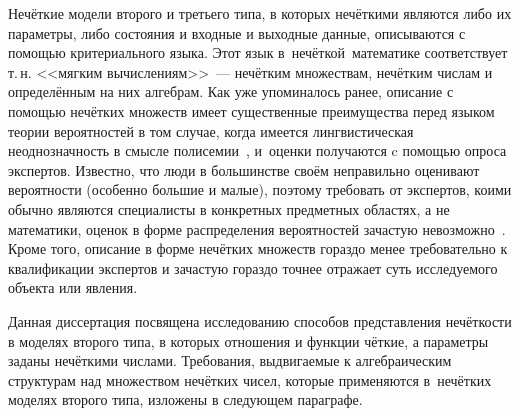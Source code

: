 Нечёткие модели второго и третьего типа, в которых нечёткими являются либо их параметры, либо состояния и входные и выходные данные, описываются с помощью критериального языка. Этот язык в~нечёткой~математике соответствует т.\,н. <<мягким вычислениям>>~--- нечётким множествам, нечётким числам и определённым на них алгебрам. Как уже упоминалось ранее, описание с помощью нечётких множеств имеет существенные преимущества перед языком теории вероятностей в том случае, когда имеется лингвистическая неоднозначность в смысле полисемии~\cite{Borisov_Alexeev_Msk}, и~оценки получаются c помощью опроса экспертов. Известно, что люди в большинстве своём неправильно оценивают вероятности (особенно большие и малые), поэтому требовать от экспертов, коими обычно являются специалисты в конкретных предметных областях, а не математики, оценок в форме распределения вероятностей зачастую невозможно~\cite{Gubko}. Кроме того, описание в форме нечётких множеств гораздо менее требовательно к квалификации экспертов и зачастую гораздо точнее отражает суть исследуемого объекта или явления.

Данная диссертация посвящена исследованию способов представления нечёткости в моделях второго типа, в которых отношения и функции чёткие, а параметры заданы нечёткими числами. Требования, выдвигаемые к алгебраическим структурам над множеством нечётких чисел, которые применяются в~нечётких моделях второго типа, изложены в следующем параграфе.